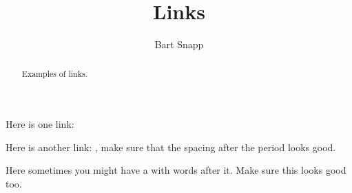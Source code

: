 \documentclass{ximera}
\title{Links}
\author{Bart Snapp}
\begin{document}
\begin{abstract}
  Examples of links.
\end{abstract}
\maketitle

Here is one link: 

Here is another link: , make sure that the spacing after the period looks good.

Here sometimes you might have a  with words after it. Make sure this looks good too.
\end{document}
